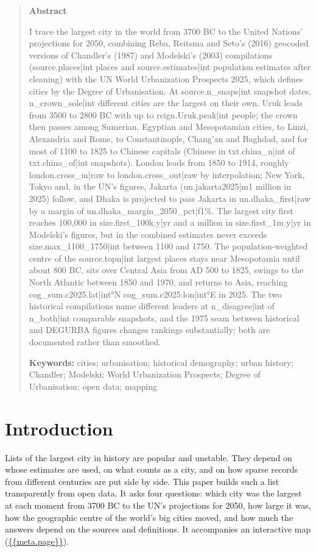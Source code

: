 \documentclass[11pt,a4paper]{article}
\begin{document}
\begin{quote}
\small
\begin{center}\textbf{Abstract}\end{center}
I trace the largest city in the world from 3700 BC to the United Nations' projections for 2050, combining Reba, Reitsma and Seto's (2016) geocoded versions of Chandler's (1987) and Modelski's (2003) compilations ({{source.places|int}} places and {{source.estimates|int}} population estimates after cleaning) with the UN World Urbanization Prospects 2025, which defines cities by the Degree of Urbanisation. At {{source.n_snaps|int}} snapshot dates, {{n_crown_sole|int}} different cities are the largest on their own. Uruk leads from 3500 to 2800 BC with up to {{reign.Uruk.peak|int}} people; the crown then passes among Sumerian, Egyptian and Mesopotamian cities, to Linzi, Alexandria and Rome, to Constantinople, Chang'an and Baghdad, and for most of 1100 to 1825 to Chinese capitals (Chinese in {{txt.china_n|int}} of {{txt.china_of|int}} snapshots). London leads from 1850 to 1914, roughly {{london.cross_in|raw}} to {{london.cross_out|raw}} by interpolation; New York, Tokyo and, in the UN's figures, Jakarta ({{un.jakarta2025|m1}} million in 2025) follow, and Dhaka is projected to pass Jakarta in {{un.dhaka_first|raw}} by a margin of {{un.dhaka_margin_2050_pct|f1}}\%. The largest city first reaches 100,000 in {{size.first_100k.y|yr}} and a million in {{size.first_1m.y|yr}} in Modelski's figures, but in the combined estimates never exceeds {{size.max_1100_1750|int}} between 1100 and 1750. The population-weighted centre of the {{source.topn|int}} largest places stays near Mesopotamia until about 800 BC, sits over Central Asia from AD 500 to 1825, swings to the North Atlantic between 1850 and 1970, and returns to Asia, reaching {{cog_sum.c2025.lat|int}}°N {{cog_sum.c2025.lon|int}}°E in 2025. The two historical compilations name different leaders at {{n_disagree|int}} of {{n_both|int}} comparable snapshots, and the 1975 seam between historical and DEGURBA figures changes rankings substantially; both are documented rather than smoothed.

\textbf{Keywords:} cities; urbanisation; historical demography; urban history; Chandler; Modelski; World Urbanization Prospects; Degree of Urbanisation; open data; mapping
\end{quote}

\section{Introduction}
Lists of the largest city in history are popular and unstable. They depend on whose estimates are used, on what counts as a city, and on how sparse records from different centuries are put side by side. This paper builds such a list transparently from open data. It asks four questions: which city was the largest at each moment from 3700 BC to the UN's projections for 2050, how large it was, how the geographic centre of the world's big cities moved, and how much the answers depend on the sources and definitions. It accompanies an interactive map (\url{{{meta.page}}}).
\end{document}
